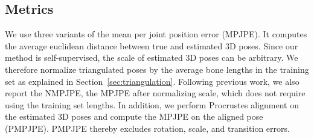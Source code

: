 \documentclass[10pt,twocolumn,letterpaper]{article}
\begin{document}
\subsection{Metrics}
We use three variants of the mean per joint position error (MPJPE). It computes the average euclidean distance between true and estimated 3D poses. Since our method is self-supervised, the scale of estimated 3D poses can be arbitrary. We therefore normalize triangulated poses by the average bone lengths in the training set as explained in Section~\ref{sec:triangulation}. 
Following previous work, we also report the NMPJPE, the MPJPE after normalizing scale, which does not require using the training set lengths.
In addition, we perform Procrustes alignment on the estimated 3D poses and compute the MPJPE on the aligned pose (PMPJPE). PMPJPE thereby excludes rotation, scale, and transition errors.
\end{document}
